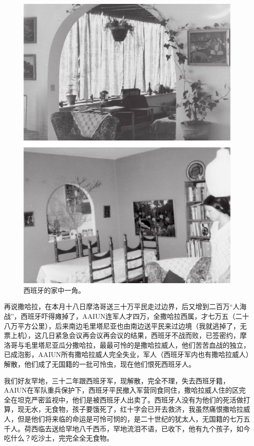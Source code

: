 \begin{figure}[htb]
    \centering %
    \includegraphics[scale=0.4]{picture/稻草人手记3.jpeg}
    \caption*{西班牙的家中一角。}
\end{figure}
\clearpage
\par 再说撒哈拉，在本月十八日摩洛哥送三十万平民走过边界，后又增到二百万“人海战”，西班牙吓得瘫掉了，AAIUN连军人才四万，全撒哈拉西属，才七万五（二十八万平方公里），后来南边毛里塔尼亚也由南边送平民来过边境（我就逃掉了，无票上机），这几日紧急会议再会议再会议的结果，西班牙不战而败，已签密约，摩洛哥与毛里塔尼亚瓜分撒哈拉，最最可怜的是撒哈拉威人，他们苦苦血战的独立，已成泡影，AAIUN所有撒哈拉威人完全失业，军人（西班牙军内也有撒哈拉威人）解散，他们成了无国籍的一批可怜虫，现在他们恨死西班牙人。
\par 我们好友罕地，三十二年跟西班牙军，现解散，完全不理，失去西班牙籍，AAIUN在军队重兵保护下，西班牙平民撤入军营同食同住，撒哈拉威人住的区完全在坦克严密监视中，他们是被西班牙人出卖了。西班牙人没有为他们的死活做打算，现无水，无食物，孩子要饿死了，红十字会已开去救济，我虽然痛恨撒哈拉威人，但是他们将来临的命运是可怜可悯的，是二十世纪的犹太人，无国籍的七万五千人。荷西临去送给罕地八千西币，罕地流泪不语，已收下，他有九个孩子，如今吃什么？吃沙土，完完全全无食物。
